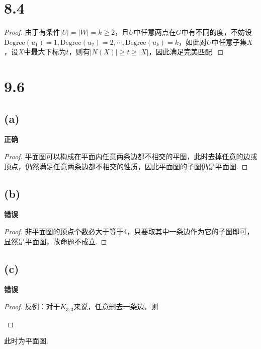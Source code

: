 \documentclass[twocolumn]{article}
\newenvironment{SChinese}{%
	\CJKfamily{gbsn}%
	\CJKtilde
	\CJKnospace}{}
\begin{document}
\begin{CJK}{UTF8}{}
\begin{SChinese}
			\section*{8.4}
				\begin{proof}
					由于有条件$|U|=|W|=k\ge2$，且$U$中任意两点在$G$中有不同的度，不妨设$\textrm{Degree}(u_1)=1,\textrm {Degree}(u_2)=2,\cdots,\textrm{Degree}(u_k)=k$，如此对$U$中任意子集$X$，设$X$中最大下标为$t$，则有$|N(X)|\ge t\ge|X|$，因此满足完美匹配.
				\end{proof}
			\section*{9.6}
				\subsection*{(a)}
					\textbf{正确}
					\begin{proof}
						平面图可以构成在平面内任意两条边都不相交的平图，此时去掉任意的边或顶点，仍然满足任意两条边都不相交的性质，因此平面图的子图仍是平面图.
					\end{proof}
				\subsection*{(b)}
					\textbf{错误}
					\begin{proof}
						非平面图的顶点个数必大于等于4，只要取其中一条边作为它的子图即可，显然是平面图，故命题不成立.
					\end{proof}
				\subsection*{(c)}
					\textbf{错误}
					\begin{proof}
						反例：对于$K_{3,3}$来说，任意删去一条边，则
						\begin{center}
						\end{center}
					\end{proof}
					此时为平面图.

\end{SChinese}
\end{CJK}
\end{document}
